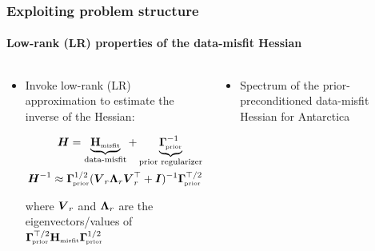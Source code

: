 \documentclass[10pt,final,xcolor=dvipsnames,aspect ratio=169]{beamer}
\begin{document}
\begin{frame}[t]
	\frametitle{Exploiting problem structure}
	\framesubtitle{Low-rank (LR) properties of the data-misfit Hessian}
	\begin{columns}
		\begin{column}{0.49\paperwidth}
			\begin{itemize}
				\item<1-> Invoke low-rank (LR) approximation to estimate the inverse of the Hessian:
				\begin{minipage}{0.9\textwidth}
					\begin{block}{}
						\vspace{-0.4cm} 
						\begin{align*} 
						\boldsymbol{H} = \underbrace{\mathbf{{H}}_{\mbox{\tiny misfit}}}_{\text{data-misfit}} + \underbrace{\boldsymbol{\Gamma}_{\!\mbox{\tiny prior}}^{-1}}_{\text{prior regularizer}} \\
						\boldsymbol{H}^{-1} \approx \boldsymbol{\Gamma}_{\!\mbox{\tiny prior}}^{1/2} (\boldsymbol{V}_r \boldsymbol{\Lambda}_r \boldsymbol{V}^{\top}_r + \boldsymbol{I})^{-1}
						\boldsymbol{\Gamma}_{\!\mbox{\tiny prior}}^{\top/2} 
						\end{align*}
					\end{block}
				\end{minipage}
				
				\vspace{0.1in}
				where $\boldsymbol{V}_r$ and $\boldsymbol{\Lambda}_r$ are the eigenvectors/values of
				$\boldsymbol{\Gamma}_{\!\mbox{\tiny prior}}^{\top/2}\mathbf{{H}}_{\mbox{\tiny misfit}}\boldsymbol{\Gamma}_{\!\mbox{\tiny prior}}^{1/2}$
			\end{itemize} 
		\end{column}
		\begin{column}{0.49\paperwidth}
			\begin{itemize}
				\item<2-> Spectrum of the prior-preconditioned data-misfit Hessian for Antarctica 
				

\end{itemize}
\end{column}
\end{columns}
\end{frame}
\end{document}
